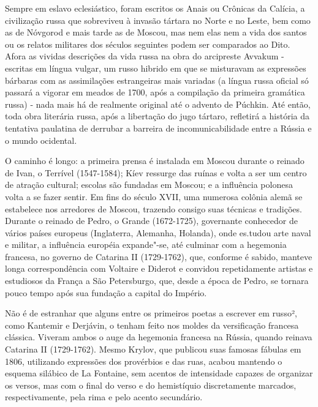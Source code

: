 Sempre em eslavo eclesiástico, foram escritos os Anais ou Crônicas da
Calícia, a civilização russa que sobreviveu à invasão tártara no Norte e
no Leste, bem como as de Nóvgorod e mais tarde as de Moscou, mas nem
elas nem a vida dos santos ou os relatos militares dos séculos seguintes
podem ser comparados ao Dito. Afora as vividas descrições da vida russa
na obra do arcipreste Avvakum - escritas em língua vulgar, um russo
hibrido em que se misturavam as expres­sões bárbaras com as assimilações
estrangeiras mais variadas (a língua russa oficial só passará a vigorar
em meados de 1700, após a compilação da primeira gramática russa) - nada
mais há de realmente original até o advento de Púchkin. Até então, toda
obra literária russa, após a libertação do jugo tártaro, refletirá a
história da tentativa paulatina de derrubar a barreira de
incomunicabilidade entre a Rússia e o mundo ocidental.

O caminho é longo: a primeira prensa é instalada em Moscou durante o
rei­nado de Ivan, o Terrível (1547-1584); Kíev ressurge das ruínas e
volta a ser um centro de atração cultural; escolas são fundadas em
Moscou; e a influência po­lonesa volta a se fazer sentir. Em fins do
século XVII, uma numerosa colônia alemã se estabelece nos arredores de
Moscou, trazendo consigo suas técnicas e tradições. Durante o reinado de
Pedro, o Grande (1672-1725), governante co­nhecedor de vários países
europeus (Inglaterra, Alemanha, Holanda), onde es­.tudou arte naval e
militar, a influência européia expande"-se, até culminar com a hegemonia
francesa, no governo de Catarina II (1729-1762), que, conforme é sabido,
manteve longa correspondência com Voltaire e Diderot e convidou
re­petidamente artistas e estudiosos da França a São Petersburgo, que,
desde a épo­ca de Pedro, se tornara pouco tempo após sua fundação a
capital do Império.

Não é de estranhar que alguns entre os primeiros poetas a escrever em
rus­so², como Kantemir e Derjávin, o tenham feito nos moldes da
versificação fran­cesa clássica. Viveram ambos o auge da hegemonia
francesa na Rússia, quando reinava Catarina II (1729-1762). Mesmo
Krylov, que publicou suas famosas fábulas em 1806, utilizando expressões
dos provérbios e das ruas, acabou man­tendo o esquema silábico de La
Fontaine, sem acentos de intensidade capazes de organizar os versos, mas
com o final do verso e do hemistíquio discreta­mente marcados,
respectivamente, pela rima e pelo acento secundário.

